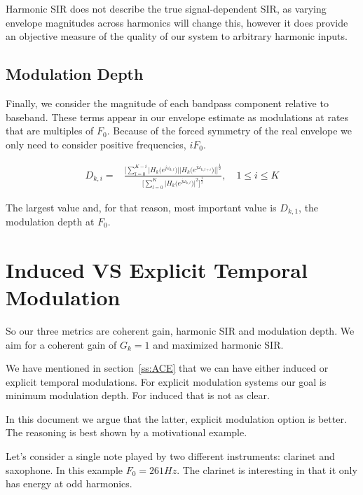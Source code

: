 \documentclass [11pt, proquest] {uwthesis}[2015/03/03]
\begin{document}
Harmonic SIR does not describe the true signal-dependent SIR, as varying envelope magnitudes across harmonics will change this, however it does provide an objective measure of the quality of our system to arbitrary harmonic inputs.


\subsection{Modulation Depth}

Finally, we consider the magnitude of each bandpass component relative to baseband.  These terms appear in our envelope estimate as modulations at rates that are multiples of $F_0$.  Because of the forced symmetry of the real envelope we only need to consider positive frequencies, $iF_0$.

\begin{align}
D_{k,i} =& \frac{\Bigg[ \sum\limits_{l=0}^{K-i} \Big|H_k\big(e^{j\omega_{k,l}}\big)\Big| \Big|H_k\big(e^{j\omega_{k,l+i}}\big)\Big|\Bigg]^\frac{1}{2}}
{\Bigg[ \sum\limits_{l=0}^K \Big|H_k\big(e^{j\omega_{k,l}}\big)\Big|^2 \Bigg] ^ \frac{1}{2}}, \quad 1 \leq i \leq K
\end{align}

The largest value and, for that reason, most important value is $D_{k,1}$, the modulation depth at $F_0$.

\section{Induced VS Explicit Temporal Modulation}

So our three metrics are coherent gain, harmonic SIR and modulation depth.  We aim for a coherent gain of $G_k = 1$ and maximized harmonic SIR.

We have mentioned in section~\ref{ss:ACE} that we can have either induced or explicit temporal modulations.  For explicit modulation systems our goal is minimum modulation depth.  For induced that is not as clear.

In this document we argue that the latter, explicit modulation option is better.  The reasoning is best shown by a motivational example.

Let's consider a single note played by two different instruments: clarinet and saxophone.  In this example $F_0 = 261Hz$.  The clarinet is interesting in that it only has energy at odd harmonics.
\end{document}
